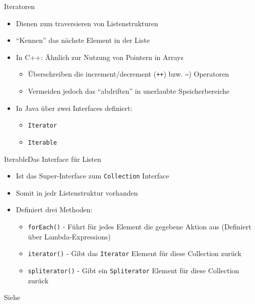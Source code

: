 \begin{frame}{Iteratoren}
    \begin{itemize}[<+->]
        \item Dienen zum traversieren von Listenstrukturen
        \item "`Kennen"' das nächste Element in der Liste
        \item In C++: Ähnlich zur Nutzung von Pointern in Arrays
        \begin{itemize}
            \item Überschreiben die increment/decrement (\texttt{++}) bzw. \texttt{--}) Operatoren
            \item Vermeiden jedoch das "`abdriften"' in unerlaubte Speicherbereiche
        \end{itemize}
        \item In Java über zwei Interfaces definiert:
        \begin{itemize}
            \item \texttt{Iterator}
            \item \texttt{Iterable}
        \end{itemize}
    \end{itemize}
\end{frame}

\begin{frame}{Iterable}{Das Interface für Listen}
    \begin{itemize}[<+->]
        \item Ist das Super-Interface zum \texttt{Collection} Interface
        \item Somit in jedr Listenstruktur vorhanden
        \item Definiert drei Methoden:
        \begin{itemize}
            \item \texttt{forEach()} - Führt für jedes Element die gegebene Aktion aus (Definiert über Lambda-Expressions)
            \item \texttt{iterator()} - Gibt das \texttt{Iterator} Element für diese Collection zurück
            \item \texttt{spliterator()} - Gibt ein \texttt{Spliterator} Element für diese Collection zurück
        \end{itemize}
    \end{itemize}
    Siehe \cite{orac:iterable}
\end{frame}

